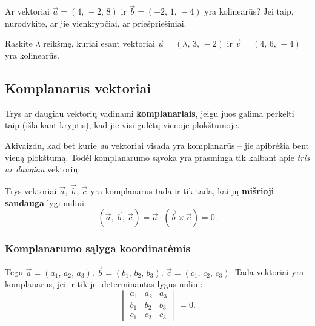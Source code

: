 \begin{exercise}
Ar vektoriai $\vec{a} = (4,\, -2,\, 8)$ ir $\vec{b} = (-2,\, 1,\, -4)$ yra kolinearūs? Jei taip, nurodykite, ar jie vienkrypčiai, ar priešpriešiniai.
\end{exercise}

\begin{exercise}
Raskite $\lambda$ reikšmę, kuriai esant vektoriai $\vec{u} = (\lambda,\, 3,\, -2)$ ir $\vec{v} = (4,\, 6,\, -4)$ yra kolinearūs.
\end{exercise}

\subsection{Komplanarūs vektoriai}

\begin{definition}
Trys ar daugiau vektorių vadinami \textbf{komplanariais}, jeigu juos galima perkelti taip (išlaikant kryptis), kad jie visi gulėtų vienoje plokštumoje.
\end{definition}

Akivaizdu, kad bet kurie \emph{du} vektoriai visada yra komplanarūs – jie apibrėžia bent vieną plokštumą. Todėl komplanarumo sąvoka yra prasminga tik kalbant apie \emph{tris ar daugiau} vektorių.

\begin{tcolorbox}[colback=green!5!white, colframe=green!60!black, title=Komplanarūmo požymis (trijų vektorių)]
Trys vektoriai $\vec{a}$, $\vec{b}$, $\vec{c}$ yra komplanarūs tada ir tik tada, kai jų \textbf{mišrioji sandauga} lygi nuliui:
\[
(\vec{a},\, \vec{b},\, \vec{c}) = \vec{a} \cdot (\vec{b} \times \vec{c}) = 0.
\]
\end{tcolorbox}

\subsubsection{Komplanarūmo sąlyga koordinatėmis}

Tegu $\vec{a} = (a_1,\, a_2,\, a_3)$, $\vec{b} = (b_1,\, b_2,\, b_3)$, $\vec{c} = (c_1,\, c_2,\, c_3)$. Tada vektoriai yra komplanarūs, jei ir tik jei determinantas lygus nuliui:
\[
\begin{vmatrix}
a_1 & a_2 & a_3 \\
b_1 & b_2 & b_3 \\
c_1 & c_2 & c_3
\end{vmatrix} = 0.
\]

